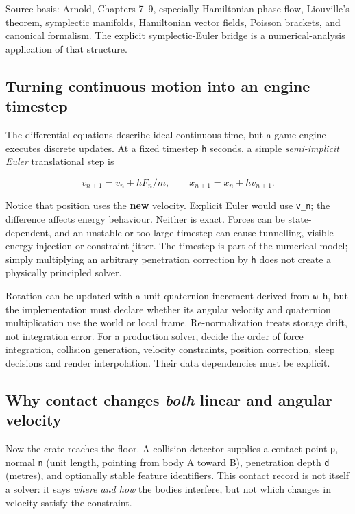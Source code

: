 Source basis: Arnold, Chapters 7--9, especially Hamiltonian phase flow, Liouville's theorem, symplectic manifolds, Hamiltonian vector fields, Poisson brackets, and canonical formalism. The explicit symplectic-Euler bridge is a numerical-analysis application of that structure.

\subsection{Turning continuous motion into an engine timestep}\label{turning-continuous-motion-into-an-engine-timestep}

The differential equations describe ideal continuous time, but a game engine executes discrete updates. At a fixed timestep \texttt{h} seconds, a simple \emph{semi-implicit Euler} translational step is

\[
v_{n+1}=v_n+h F_n/m,\qquad x_{n+1}=x_n+h v_{n+1}.
\]

Notice that position uses the \textbf{new} velocity. Explicit Euler would use \texttt{v\_n}; the difference affects energy behaviour. Neither is exact. Forces can be state-dependent, and an unstable or too-large timestep can cause tunnelling, visible energy injection or constraint jitter. The timestep is part of the numerical model; simply multiplying an arbitrary penetration correction by \texttt{h} does not create a physically principled solver.

Rotation can be updated with a unit-quaternion increment derived from \texttt{ω\ h}, but the implementation must declare whether its angular velocity and quaternion multiplication use the world or local frame. Re-normalization treats storage drift, not integration error. For a production solver, decide the order of force integration, collision generation, velocity constraints, position correction, sleep decisions and render interpolation. Their data dependencies must be explicit.

\subsection{\texorpdfstring{Why contact changes \emph{both} linear and angular velocity}{Why contact changes both linear and angular velocity}}\label{why-contact-changes-both-linear-and-angular-velocity}

Now the crate reaches the floor. A collision detector supplies a contact point \texttt{p}, normal \texttt{n} (unit length, pointing from body A toward B), penetration depth \texttt{d} (metres), and optionally stable feature identifiers. This contact record is not itself a solver: it says \emph{where and how} the bodies interfere, but not which changes in velocity satisfy the constraint.

